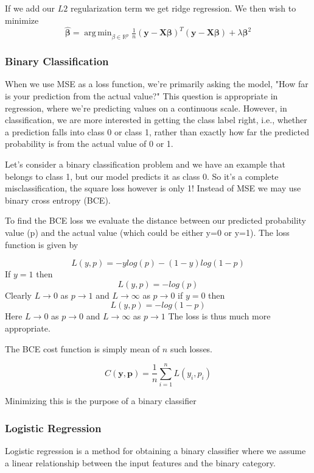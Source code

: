\documentclass{article}
\theoremstyle{definition}
\DeclareMathOperator*{\argmin}{arg\,min}
\begin{document}
If we add our $L2$ regularization term we get ridge regression. We then wish to minimize
\begin{equation*}
    \bm{\hat{\beta}} = \argmin_{\beta \in \mathbb{R}^p}\tfrac{1}{n}(\mathbf{y} - \mathbf{X}\bm{\beta})^T(\mathbf{y} - \mathbf{X}\bm{\beta}) + \lambda\bm{\beta}^2
\end{equation*}

\subsubsection{Binary Classification}
When we use MSE as a loss function, we're primarily asking the model, "How far is your prediction from the actual value?" This question is appropriate in regression, where we're predicting values on a continuous scale. However, in classification, we are more interested in getting the class label right, i.e., whether a prediction falls into class 0 or class 1, rather than exactly how far the predicted probability is from the actual value of 0 or 1.

Let's consider a binary classification problem and we have an example that belongs to class 1, but our model predicts it as class 0. So it's a complete misclassification, the square loss however is only 1! Instead of MSE we may use binary cross entropy (BCE).

 To find the BCE loss we evaluate the distance between our predicted probability value (p) and the actual value (which could be either y=0 or y=1). The loss function is given by

\[
L(y, p) = -ylog(p) - (1-y)log(1-p)
\]
If $y=1$ then
\[
L(y,p) = -log(p)
\]
Clearly  $L \to 0$ as $p \to 1$ and $L \to \infty$ as $p \to 0$
if $y = 0$ then
\[
L(y,p) = -log(1-p)
\]
Here $L \to 0$ as $p \to 0$ and $L \to \infty$ as $p \to 1$
The loss is thus much more appropriate.


The BCE cost function is simply mean of $n$ such losses.

\[
C(\mathbf{y}, \mathbf{p}) = \frac{1}{n} \sum_{i=1}^{n} L(y_i, p_i)
\]

Minimizing this is the purpose of a binary classifier

\subsubsection{Logistic Regression}
Logistic regression is a method for obtaining a binary classifier where we assume a linear relationship between the input features and the binary category.
\end{document}
